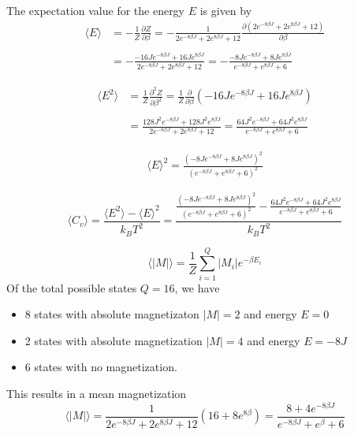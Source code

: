 \documentclass[10pt,a4paper]{article}
\begin{document}
The expectation value for the energy $E$ is given by
\begin{equation}\begin{split}
\langle E \rangle &= -\frac{1}{Z}\frac{\partial Z}{\partial\beta} = -\frac{1}{2e^{-8\beta J} + 2e^{8\beta J} + 12} \frac{\partial (2e^{-8\beta J} + 2e^{8\beta J} + 12)}{\partial \beta}\\\\
&= -\frac{-16Je^{-8\beta J} + 16Je^{8\beta J}}{2e^{-8\beta J} + 2e^{8\beta J} + 12} = -\frac{-8Je^{-8\beta J} + 8Je^{8\beta J}}{e^{-8\beta J} + e^{8\beta J} + 6}
\end{split}\end{equation}

\begin{equation}\begin{split}
\langle E^2 \rangle &= \frac{1}{Z}\frac{\partial^2 Z}{\partial\beta^2} = \frac{1}{Z}\frac{\partial}{\partial\beta}\left(-16Je^{-8\beta J} + 16Je^{8\beta J} \right)\\\\
&= \frac{128J^2e^{-8\beta J} + 128J^2e^{8\beta J}}{2e^{-8\beta J}+2e^{8\beta J} + 12} = \frac{64J^2e^{-8\beta J} + 64J^2e^{8\beta J}}{e^{-8\beta J}+e^{8\beta J} + 6}
\end{split}\end{equation}


\begin{equation}\begin{split}
\langle E \rangle ^2 = \frac{\left(-8Je^{-8\beta J} + 8Je^{8\beta J}\right)^2}{\left(e^{-8\beta J} + e^{8\beta J} + 6\right)^2}
\end{split}\end{equation}

\begin{equation}
\langle C_v \rangle = \frac{\langle E^2 \rangle - \langle E \rangle ^2}{k_B T^2} = \frac{\frac{\left(-8Je^{-8\beta J} + 8Je^{8\beta J}\right)^2}{\left(e^{-8\beta J} + e^{8\beta J} + 6\right)^2} - \frac{64J^2e^{-8\beta J} + 64J^2e^{8\beta J}}{e^{-8\beta J}+e^{8\beta J} + 6}}{k_B T^2}
\end{equation}


\begin{equation}
\langle |M| \rangle = \frac{1}{Z} \sum\limits_{i=1}^Q |M_i| e^{-\beta E_i}
\end{equation}
Of the total possible states $Q = 16$, we have
\begin{itemize}
\item 8 states with absolute magnetizaton $|M| = 2$ and energy $E = 0$
\item 2 states with absolute magnetization $|M| = 4$ and energy $E = -8J$
\item 6 states with no magnetization.
\end{itemize}
This results in a mean magnetization
\begin{equation}
\langle |M| \rangle = \frac{1}{2e^{-8\beta J} + 2e^{8\beta J} + 12} (16+8e^{8\beta}) = \frac{8+4e^{-8\beta J}}{e^{-8\beta J} + e^{\beta} + 6}
\end{equation}
\end{document}
